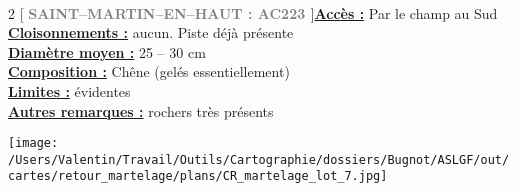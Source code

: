 \documentclass[a4paper,openany]{book}\usepackage[]{graphicx}\usepackage[]{color}
\begin{document}
\\\begin{multicols}{2}
[
\textbf{\textcolor{gray}{
\large SAINT--MARTIN--EN--HAUT : AC223
}}
]\noindent\textbf{\underline{Accès :}} Par le champ au Sud\vspace{0.1cm} \\\noindent\textbf{\underline{Cloisonnements :}} aucun. Piste déjà présente\vspace{0.1cm} \\\noindent\textbf{\underline{Diamètre moyen :}} 25 -- 30 cm\vspace{0.1cm} \\\noindent\textbf{\underline{Composition :}} Chêne (gelés essentiellement)\vspace{0.1cm} \\\noindent\textbf{\underline{Limites :}} évidentes\vspace{0.1cm} \\\noindent\textbf{\underline{Autres remarques :}} rochers très présents\vspace{0.1cm} \\\end{multicols}\begin{center}
\texttt{[image: /Users/Valentin/Travail/Outils/Cartographie/dossiers/Bugnot/ASLGF/out/cartes/retour\_martelage/plans/CR\_martelage\_lot\_7.jpg]}
\end{center}\newpage\noindent
\end{document}
